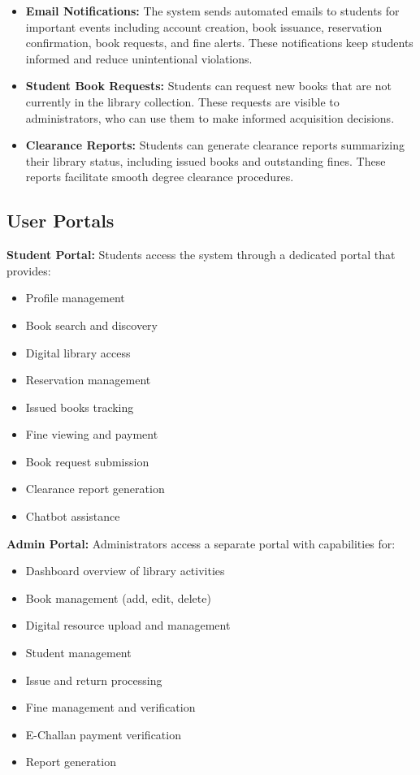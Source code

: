 \documentclass[12pt,a4paper]{report}
\begin{document}
\begin{itemize}
\newpage   

   \item \textbf{Email Notifications:} The system sends automated emails to students for important events including account creation, book issuance, reservation confirmation, book requests, and fine alerts. These notifications keep students informed and reduce unintentional violations.


   \item \textbf{Student Book Requests:} Students can request new books that are not currently in the library collection. These requests are visible to administrators, who can use them to make informed acquisition decisions.

   \item \textbf{Clearance Reports:} Students can generate clearance reports summarizing their library status, including issued books and outstanding fines. These reports facilitate smooth degree clearance procedures.
   
\end{itemize}

\subsection{User Portals}

\textbf{Student Portal:} Students access the system through a dedicated portal that provides:

\begin{itemize}
    \item Profile management
    \item Book search and discovery
    \item Digital library access
    \item Reservation management
    \item Issued books tracking
    \item Fine viewing and payment
    \item Book request submission
    \item Clearance report generation
    \item Chatbot assistance
\end{itemize}
\textbf{Admin Portal:} Administrators access a separate portal with capabilities for:

\begin{itemize}
    \item Dashboard overview of library activities
    \item Book management (add, edit, delete)
    \item Digital resource upload and management
    \item Student management
    \item Issue and return processing
    \item Fine management and verification
    \item E-Challan payment verification
    \item Report generation
\end{itemize}
\end{document}
